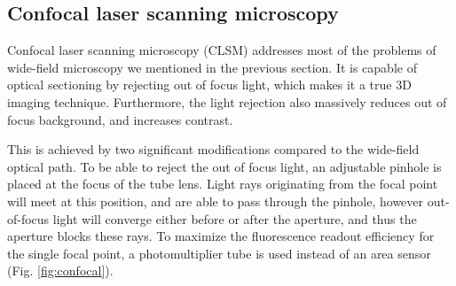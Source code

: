 




                                                              

  \subsection{Confocal laser scanning microscopy}

    Confocal laser scanning microscopy (CLSM) \cite{minsky_microscopy_1961,davidovits_scanning_1969} addresses most of the problems of wide-field microscopy we mentioned in the previous section. It is capable of optical sectioning by rejecting out of focus light, which makes it a
    true %
    3D imaging technique. Furthermore, the light rejection also massively reduces out of focus background, and increases contrast.

    This is achieved by two significant modifications compared to the wide-field optical path. To be able to reject the out of focus light, an adjustable pinhole is placed at the focus of the tube lens. Light rays originating from the focal point will meet at this position, and are able to pass through the pinhole, however out-of-focus light will converge either before or after the aperture, and thus the aperture blocks these rays. To maximize the fluorescence readout efficiency for the single focal point, a photomultiplier tube is used instead of an area sensor (Fig. \ref{fig:confocal}).

